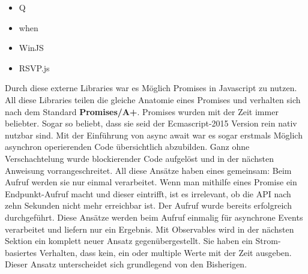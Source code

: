 \begin{itemize}
\item Q
\item when
\item WinJS
\item RSVP.js
\end{itemize}

\noindent
Durch diese externe Libraries war es Möglich Promises in Javascript zu nutzen. All diese Libraries teilen die gleiche Anatomie eines Promises und verhalten sich nach dem Standard \textbf{Promises/A+}.\cite{promises-a+} Promises wurden mit der Zeit immer beliebter. Sogar so beliebt, dass sie seid der Ecmascript-2015 Version rein nativ nutzbar sind. Mit der Einführung von async await war es sogar erstmals Möglich asynchron operierenden Code übersichtlich abzubilden. Ganz ohne Verschachtelung wurde blockierender Code aufgelöst und in der nächsten Anweisung vorrangeschreitet. All diese Ansätze haben eines gemeinsam: Beim Aufruf werden sie nur einmal verarbeitet. Wenn man mithilfe eines Promise ein Endpunkt-Aufruf macht und dieser eintrifft, ist es irrelevant, ob die API nach zehn Sekunden nicht mehr erreichbar ist. Der Aufruf wurde bereits erfolgreich durchgeführt. Diese Ansätze werden beim Aufruf einmalig für asynchrone Events verarbeitet und liefern nur ein Ergebnis. Mit Observables wird in der nächsten Sektion ein komplett neuer Ansatz gegenübergestellt. Sie haben ein Strom-basiertes Verhalten, dass kein, ein oder multiple Werte mit der Zeit ausgeben. Dieser Ansatz unterscheidet sich grundlegend von den Bisherigen.
